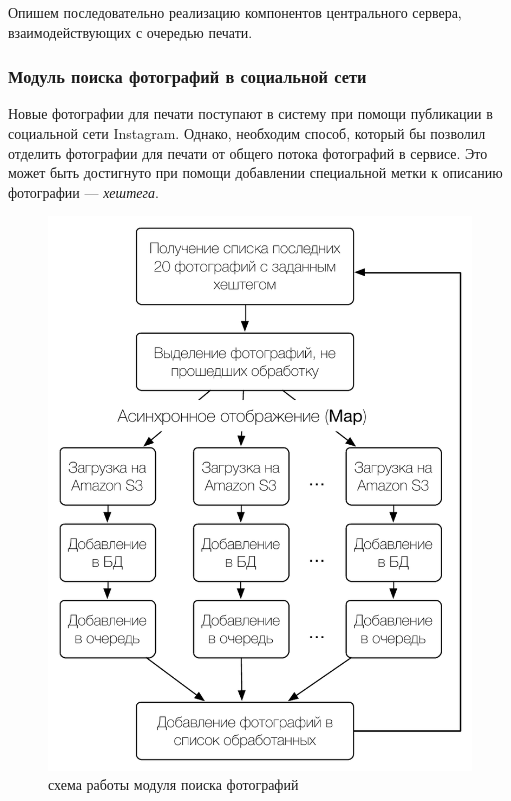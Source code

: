 \documentclass[a4paper,14pt,href,draft]{article}
\begin{document}
Опишем последовательно реализацию компонентов центрального сервера, взаимодействующих с очередью печати.

\subsubsection{Модуль поиска фотографий в социальной сети}
Новые фотографии для печати поступают в систему при помощи публикации в социальной сети Instagram. Однако, необходим
способ, который бы позволил отделить фотографии для печати от общего потока фотографий в сервисе. Это может быть
достигнуто при помощи добавлении специальной метки к описанию фотографии --- \textit{хештега}.

\begin{figure}[htbp]
\begin{center}
  \includegraphics[scale=0.8]{map-reduce.pdf}
    \caption{схема работы модуля поиска фотографий}
    \label{fig:MapReduce}
\end{center}
\end{figure}
\end{document}
